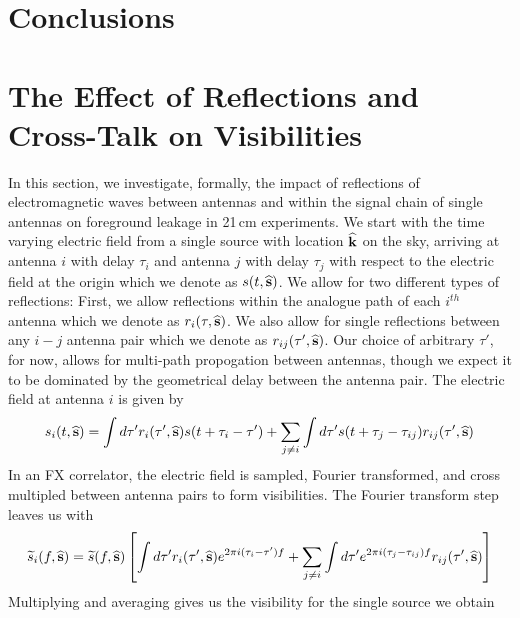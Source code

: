 \documentclass[twocolumn]{emulateapj}
\begin{document}
\section{Conclusions}
\label{sec:Conclusion}



\appendix
\section{The Effect of Reflections and Cross-Talk on Visibilities}\label{app:Reflections}
In this section, we investigate, formally, the impact of reflections of electromagnetic waves between antennas and within the signal chain of single antennas on foreground leakage in 21\,cm experiments. We start with the time varying electric field from a single source with location ${\bf \widehat{k}}$ on the sky, arriving at antenna $i$ with delay $\tau_i$ and antenna $j$ with delay $\tau_j$ with respect to the electric field at the origin which we denote as $s(t,{\bf \widehat{s}})$. We allow for two different types of reflections: First, we allow reflections within the analogue path of each $i^{th}$ antenna which we denote as $r_i(\tau,{\bf \widehat{s}})$. We also allow for single reflections between any $i-j$ antenna pair which we denote as $r_{ij}(\tau',{\bf \widehat{s}})$. Our choice of arbitrary $\tau'$, for now, allows for multi-path propogation between antennas, though we expect it to be dominated by the geometrical delay between the antenna pair. The electric field at antenna $i$ is given by
\begin{equation}
s_i(t,{\bf \widehat{s}}) = \int d \tau' r_i(\tau',{\bf \widehat{s}})s(t+\tau_i-\tau') + \sum_{j \ne i} \int d \tau' s(t + \tau_j - \tau_{ij}) r_{ij}(\tau',{\bf \widehat{s}})
\end{equation}  
In an FX correlator, the electric field is sampled, Fourier transformed, and cross multipled between antenna pairs to form visibilities. The Fourier transform step leaves us with 
\begin{equation}
\widetilde{s}_i(f,{\bf \widehat{s}}) = \widetilde{s}(f,{\bf \widehat{s}}) \left[ \int d \tau' r_i(\tau',{\bf \widehat{s}})e^{2 \pi i(\tau_i - \tau')f} + \sum_{j\ne i} \int d \tau' e^{2 \pi i(\tau_j - \tau_{ij})f} r_{ij}(\tau',{\bf \widehat{s}}) \right]
\end{equation}
Multiplying and averaging gives us the visibility for the single source we obtain
\end{document}
